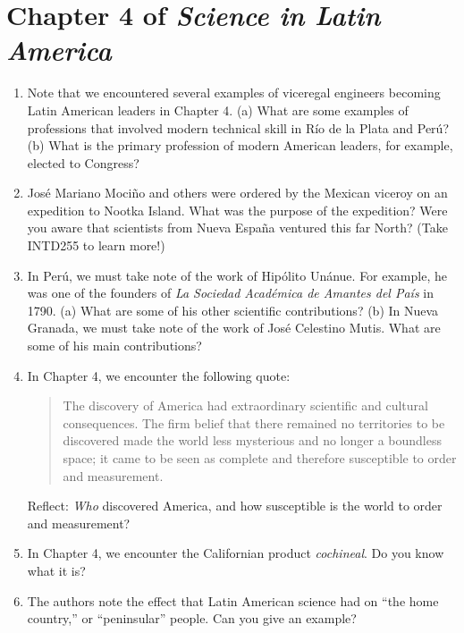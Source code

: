 \documentclass[12pt]{article}
\begin{document}
\maketitle
\small

\section{Chapter 4 of \textit{Science in Latin America}}

\begin{enumerate}
\item Note that we encountered several examples of viceregal engineers becoming Latin American leaders in Chapter 4.  (a) What are some examples of professions that involved modern technical skill in R\'{i}o de la Plata and Per\'{u}? (b) What is the primary profession of modern American leaders, for example, elected to Congress? \\ \vspace{1.5cm}
\item Jos\'{e} Mariano Moci\~{n}o and others were ordered by the Mexican viceroy on an expedition to Nootka Island.  What was the purpose of the expedition?  Were you aware that scientists from Nueva Espa\~{n}a ventured this far North? (Take INTD255 to learn more!) \\ \vspace{1cm}
\item In Per\'{u}, we must take note of the work of Hip\'{o}lito Un\'{a}nue.  For example, he was one of the founders of \textit{La Sociedad Acad\'{e}mica de Amantes del Pa\'{i}s} in 1790.  (a) What are some of his other scientific contributions? (b) In Nueva Granada, we must take note of the work of Jos\'{e} Celestino Mutis.  What are some of his main contributions? \\ \vspace{1.25cm}
\item In Chapter 4, we encounter the following quote:
\begin{quote}
The discovery of America had extraordinary scientific and cultural consequences.  The firm belief that there remained no territories to be discovered made the world less mysterious and no longer a boundless space; it came to be seen as complete and therefore susceptible to order and measurement.
\end{quote}
Reflect: \textit{Who} discovered America, and how susceptible is the world to order and measurement? \\ \vspace{0.5cm}
\item In Chapter 4, we encounter the Californian product \textit{cochineal}.  Do you know what it is?
\item The authors note the effect that Latin American science had on ``the home country,'' or ``peninsular'' people.  Can you give an example?
\end{enumerate}
\end{document}
